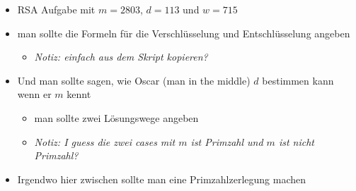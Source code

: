 \begin{aufgabe}
\begin{itemize}
  \item RSA Aufgabe mit $m = 2803$, $d = 113$ und $w = 715$
  \item man sollte die Formeln für die Verschlüsselung und Entschlüsselung angeben
  \begin{itemize}
    \item \textit{Notiz: einfach aus dem Skript kopieren?}
  \end{itemize}
  \item Und man sollte sagen, wie Oscar (man in the middle) $d$ bestimmen kann wenn er $m$ kennt
  \begin{itemize}
    \item man sollte zwei Lösungswege angeben
    \item \textit{Notiz: I guess die zwei cases mit $m$ ist Primzahl und $m$ ist nicht Primzahl?}
  \end{itemize}
  \item Irgendwo hier zwischen sollte man eine Primzahlzerlegung machen
\end{itemize}
\end{aufgabe}

